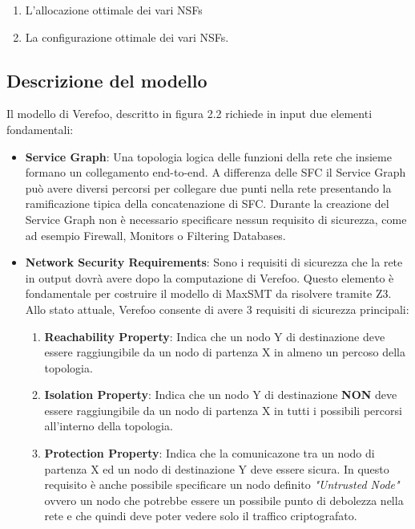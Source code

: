 \begin{enumerate}
    \item L'allocazione ottimale dei vari NSFs
    \item La configurazione ottimale dei vari NSFs.
\end{enumerate}

\subsection{Descrizione del modello}
Il modello di Verefoo, descritto in figura 2.2 richiede in input due elementi fondamentali:

\begin{itemize}
    \item \textbf{Service Graph}: Una topologia logica delle funzioni della rete che insieme formano un collegamento end-to-end. A differenza delle SFC il Service Graph può avere diversi percorsi per collegare due punti nella rete
    presentando la ramificazione tipica della concatenazione di SFC. Durante la creazione del Service Graph non è necessario specificare nessun requisito di sicurezza, come ad esempio Firewall, Monitors o Filtering Databases. 
    \item \textbf{Network Security Requirements}: Sono i requisiti di sicurezza che la rete in output dovrà avere dopo la computazione di Verefoo. Questo elemento è fondamentale per costruire il modello di MaxSMT da risolvere tramite Z3.
    Allo stato attuale, Verefoo consente di avere 3 requisiti di sicurezza principali:
        \begin{enumerate}
            \item \textbf{Reachability Property}: Indica che un nodo Y di destinazione deve essere raggiungibile da un nodo di partenza X in almeno un percoso della topologia.
            \item \textbf{Isolation Property}: Indica che un nodo Y di destinazione \textbf{NON} deve essere raggiungibile da un nodo di partenza X in tutti i possibili percorsi all'interno della topologia.
            \item \textbf{Protection Property}: Indica che la comunicazone tra un nodo di partenza X ed un nodo di destinazione Y deve essere sicura. In questo requisito è anche possibile specificare
                un nodo definito \textit{"Untrusted Node"} ovvero un nodo che potrebbe essere un possibile punto di debolezza nella rete e che quindi deve poter vedere solo il traffico criptografato.
        \end{enumerate}
\end{itemize}


